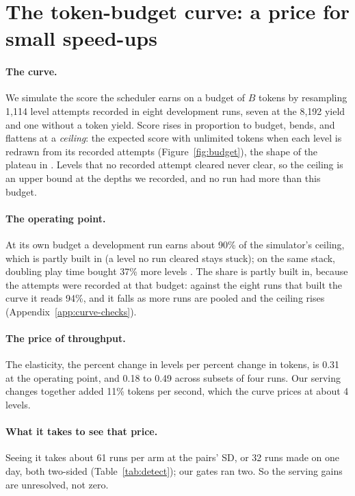 \section{The token-budget curve: a price for small speed-ups}\label{sec:curve}

\paragraph{The curve.}
We simulate the score the scheduler earns on a budget of $B$ tokens by resampling 1,114 level attempts recorded in eight development runs, seven at the 8,192 yield and one without a token yield. %
Score rises in proportion to budget, bends, and flattens at a \emph{ceiling}: the expected score with unlimited tokens when each level is redrawn from its recorded attempts (Figure~\ref{fig:budget}), the shape of the plateau in \citet{pourcel2025soar}. %
Levels that no recorded attempt cleared never clear, so the ceiling is an upper bound at the depths we recorded, and no run had more than this budget. %

\paragraph{The operating point.}
At its own budget a development run earns about 90\% of the simulator's ceiling, which is partly built in (a level no run cleared stays stuck); on the same stack, doubling play time bought 37\% more levels \citep{shah2026lottery}. %
The share is partly built in, because the attempts were recorded at that budget: against the eight runs that built the curve it reads 94\%, and it falls as more runs are pooled and the ceiling rises (Appendix~\ref{app:curve-checks}). %

\paragraph{The price of throughput.}
The elasticity, the percent change in levels per percent change in tokens, is 0.31 at the operating point, and 0.18 to 0.49 across subsets of four runs. %
Our serving changes together added 11\% tokens per second, which the curve prices at about 4 levels. %

\paragraph{What it takes to see that price.}
Seeing it takes about 61 runs per arm at the pairs' SD, or 32 runs made on one day, both two-sided (Table~\ref{tab:detect}); our gates ran two. %
So the serving gains are unresolved, not zero.


